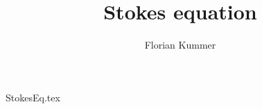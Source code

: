 \documentclass[10pt,a4paper]{article}
\title{Stokes equation}
\author{Florian Kummer}
\begin{document}
\maketitle

{StokesEq.tex}
\end{document}
